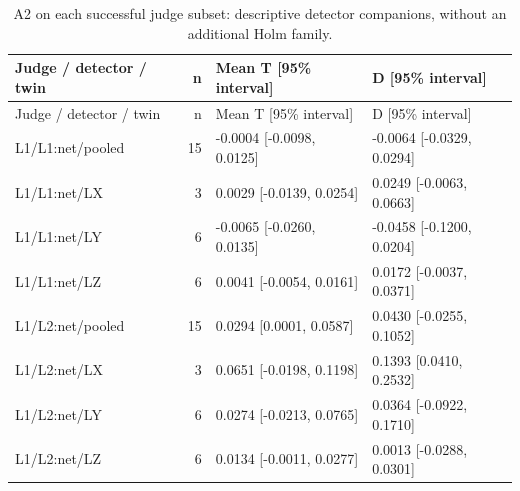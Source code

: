\begin{longtable}{@{}p{1.8in}rl l@{}}
\caption{A2 on each successful judge subset: descriptive detector companions, without an additional Holm family.}\\
\toprule Judge / detector / twin & n & Mean T [95\% interval] & D [95\% interval]\\\midrule\endfirsthead
\toprule Judge / detector / twin & n & Mean T [95\% interval] & D [95\% interval]\\\midrule\endhead
\bottomrule\endfoot
L1/\allowbreak L1:net/\allowbreak pooled & 15 & -0.0004 [-0.0098, 0.0125] & -0.0064 [-0.0329, 0.0294]\\
L1/\allowbreak L1:net/\allowbreak LX & 3 & 0.0029 [-0.0139, 0.0254] & 0.0249 [-0.0063, 0.0663]\\
L1/\allowbreak L1:net/\allowbreak LY & 6 & -0.0065 [-0.0260, 0.0135] & -0.0458 [-0.1200, 0.0204]\\
L1/\allowbreak L1:net/\allowbreak LZ & 6 & 0.0041 [-0.0054, 0.0161] & 0.0172 [-0.0037, 0.0371]\\
L1/\allowbreak L2:net/\allowbreak pooled & 15 & 0.0294 [0.0001, 0.0587] & 0.0430 [-0.0255, 0.1052]\\
L1/\allowbreak L2:net/\allowbreak LX & 3 & 0.0651 [-0.0198, 0.1198] & 0.1393 [0.0410, 0.2532]\\
L1/\allowbreak L2:net/\allowbreak LY & 6 & 0.0274 [-0.0213, 0.0765] & 0.0364 [-0.0922, 0.1710]\\
L1/\allowbreak L2:net/\allowbreak LZ & 6 & 0.0134 [-0.0011, 0.0277] & 0.0013 [-0.0288, 0.0301]\\

\end{longtable}

